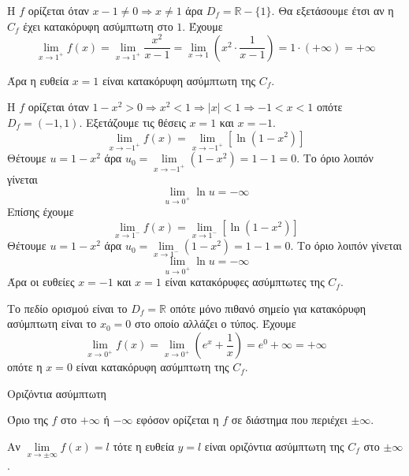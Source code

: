 \lysh\vspace{-5mm}
\begin{alist}
\item Η $f$ ορίζεται όταν $x-1\neq 0\Rightarrow x\neq 1$ άρα $D_f=\mathbb{R}-\{1\}$. Θα εξετάσουμε έτσι αν η $C_f$ έχει κατακόρυφη ασύμπτωτη στο $1$. Έχουμε
\[\lim\limits_{x\to 1^+}{f(x)}=\lim\limits_{x\to 1^+}{\frac{x^2}{x-1}}=\lim\limits_{x\to 1}\left(x^2\cdot\frac{1}{x-1}\right)=1\cdot(+\infty)=+\infty\]

Άρα η ευθεία $x=1$ είναι κατακόρυφη ασύμπτωτη της $C_f$.
\item Η $f$ ορίζεται όταν $1-x^2>0\Rightarrow x^2<1\Rightarrow |x|<1\Rightarrow -1<x<1$ οπότε $D_f=(-1,1)$. Εξετάζουμε τις θέσεις $x=1$ και $x=-1$.
\[\lim\limits_{x\to -1^+}{f(x)}=\lim\limits_{x\to -1^+}{\left[\ln\left(1-x^2\right)\right]}\]
Θέτουμε $u=1-x^2$ άρα $u_0=\lim\limits_{x\to -1^+}{\left(1-x^2\right)}=1-1=0$. Το όριο λοιπόν γίνεται
\[ \lim\limits_{u\to0^+}{\ln{u}}=-\infty \]
Επίσης έχουμε
\[\lim\limits_{x\to 1^-}{f(x)}=\lim\limits_{x\to 1^-}{\left[\ln\left(1-x^2\right)\right]}\]
Θέτουμε $u=1-x^2$ άρα $u_0=\lim\limits_{x\to 1^-}{\left(1-x^2\right)}=1-1=0$. Το όριο λοιπόν γίνεται
\[ \lim\limits_{u\to0^+}{\ln{u}}=-\infty \]
Άρα οι ευθείες $x=-1$ και $x=1$ είναι κατακόρυφες ασύμπτωτες της $C_f$.
\item Το πεδίο ορισμού είναι το $D_f=\mathbb{R}$ οπότε μόνο πιθανό σημείο για κατακόρυφη ασύμπτωτη είναι το $x_0=0$ στο οποίο αλλάζει ο τύπος. Έχουμε
\[ \lim\limits_{x\to 0^+}{f(x)}=\lim\limits_{x\to 0^+}{\left(e^x+\frac{1}{x}\right)}=e^0+\infty=+\infty \]
οπότε η $x=0$ είναι κατακόρυφη ασύμπτωτη της $C_f$.
\end{alist}
\begin{askhsh}{Οριζόντια ασύμπτωτη}
\bhmata\begin{bhma}
\item Όριο της $ f $ στο $ +\infty $ ή $ -\infty $ εφόσον ορίζεται η $ f $ σε διάστημα που περιέχει $ \pm\infty $.
\item Αν $ \lim\limits_{x\to \pm\infty}{f(x)}=l $ τότε η ευθεία $ y=l $ είναι οριζόντια ασύμπτωτη της $ C_f $ στο $ \pm\infty $.
\end{bhma}
\end{askhsh}


